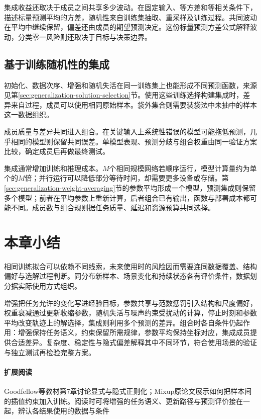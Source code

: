 集成收益还取决于成员之间共享多少波动。在固定输入、等方差和等相关条件下，描述标量预测平均的方差，随机性来自训练集抽取、重采样及训练过程。共同波动在平均中继续保留，偏差还由成员的期望预测决定。这份标量预测方差公式解释波动，分类零一风险则还取决于目标与决策边界。

\subsection{基于训练随机性的集成}
\label{sec:generalization-randomness-ensemble}

初始化、数据次序、增强和随机失活在同一训练集上也能形成不同预测函数，来源见第\ref{sec:generalization-solution-selection}节。使用这些训练选择构建集成时，差异来自过程，成员可以使用相同原始样本。袋外集合则需要装袋法中未抽中的样本这一数据组织。

成员质量与差异共同进入组合。在关键输入上系统性错误的模型可能拖低预测，几乎相同的模型则保留共同误差。单模型表现、预测分歧与组合权重由同一验证方案比较，确定成员后再做最终测试。

集成通常增加训练和推理成本。$M$个相同规模网络若顺序运行，模型计算量约为单个的$M$倍；并行运行可以降低部分等待时间，却需要更多设备或存储。第\ref{sec:generalization-weight-averaging}节的参数平均形成一个模型，预测集成则保留多个模型；前者在平均参数上重新计算，后者组合已有输出，函数与部署成本都可能不同。成员数与组合规则据任务质量、延迟和资源预算共同选择。

\section{本章小结}
\label{sec:generalization-summary}

相同训练拟合可以依赖不同线索，未来使用时的风险因而需要连同数据覆盖、结构偏好与选解过程判断。同分布新样本、场景变化和持续状态各有评价条件，数据划分据实际使用方式组织。

增强把任务允许的变化写进经验目标，参数共享与范数惩罚引入结构和尺度偏好，权重衰减通过更新收缩参数，随机失活与噪声约束受扰动的计算，停止时刻和参数平均改变轨迹上的解选择，集成则利用多个预测的差异。组合时各自条件仍起作用：增强保持任务语义，约束保留所需规律，参数平均保持坐标对应，集成成员提供合适差异。复杂度、稳定性与隐式偏差解释其中不同环节，符合使用场景的验证与独立测试再检验完整方案。

\paragraph{扩展阅读}
Goodfellow等教材第7章讨论显式与隐式正则化；Mixup原论文展示如何把样本间的插值约束加入训练。阅读时可将增强的任务语义、更新路径与预测评价接在一起，辨认各结果使用的数据与条件
